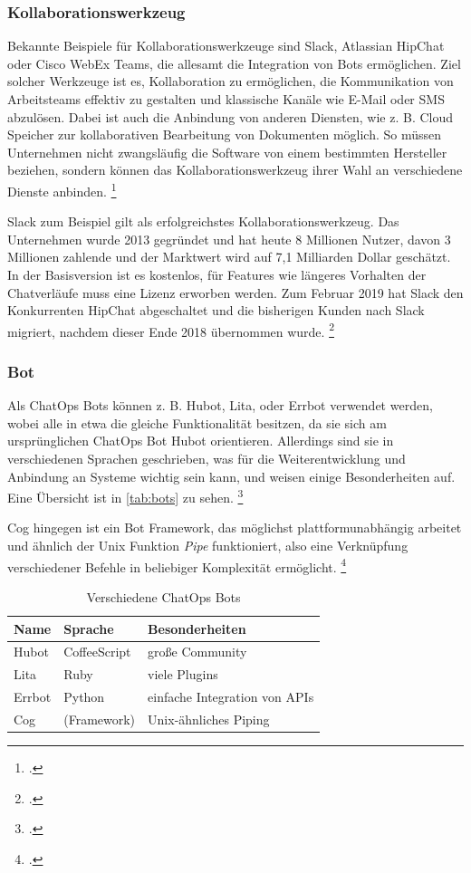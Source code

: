 \subsubsection{Kollaborationswerkzeug}
Bekannte Beispiele für Kollaborationswerkzeuge sind Slack, Atlassian HipChat oder Cisco WebEx Teams, die allesamt die Integration von Bots ermöglichen.
Ziel solcher Werkzeuge ist es, Kollaboration zu ermöglichen, die Kommunikation von Arbeitsteams effektiv zu gestalten und klassische Kanäle wie E-Mail oder SMS abzulösen. Dabei ist auch die Anbindung von anderen Diensten, wie z. B. Cloud Speicher zur kollaborativen Bearbeitung von Dokumenten möglich. So müssen Unternehmen nicht zwangsläufig die Software von einem bestimmten Hersteller beziehen, sondern können das Kollaborationswerkzeug ihrer Wahl an verschiedene Dienste anbinden.
\footcites[Vgl.][o. \pno]{Zyane_2017_ChatOps}[Vgl.][o. \pno]{Koeltzsch_2019_Slack}

Slack zum Beispiel gilt als erfolgreichstes Kollaborationswerkzeug. Das Unternehmen wurde 2013 gegründet und hat heute 8 Millionen Nutzer, davon 3 Millionen zahlende und der Marktwert wird auf 7,1 Milliarden Dollar geschätzt. In der Basisversion ist es kostenlos, für Features wie längeres Vorhalten der Chatverläufe muss eine Lizenz erworben werden.
Zum Februar 2019 hat Slack den Konkurrenten HipChat abgeschaltet und die bisherigen Kunden nach Slack migriert, nachdem dieser Ende 2018 übernommen wurde.
\footcites[Vgl.][o. \pno]{Koeltzsch_2019_Slack}[Vgl.][o. \pno]{Donath_2018_Hipchat_Uebernahme}

\subsubsection{Bot}
Als ChatOps Bots können z. B. Hubot, Lita, oder  Errbot verwendet werden, wobei alle in etwa die gleiche Funktionalität besitzen, da sie sich am ursprünglichen ChatOps Bot Hubot orientieren.
Allerdings sind sie in verschiedenen Sprachen geschrieben, was für die Weiterentwicklung und Anbindung an Systeme wichtig sein kann, und weisen einige Besonderheiten auf. Eine Übersicht ist in \autoref{tab:bots} zu sehen.
\footcite[Vgl.][o. \pno]{Zyane_2017_ChatOps}

Cog hingegen ist ein Bot Framework, das möglichst plattformunabhängig arbeitet und ähnlich der Unix Funktion \textit{Pipe} funktioniert, also eine Verknüpfung verschiedener Befehle in beliebiger Komplexität ermöglicht.
\footcite[Vgl.][o. \pno]{Zyane_2017_ChatOps}

\begin{table}[H]
\centering
\begin{tabularx}{.8\textwidth}{l|l|X}
  Name & Sprache & Besonderheiten\\\hline
  Hubot & CoffeeScript & große Community\\
  Lita & Ruby & viele Plugins\\
  Errbot & Python & einfache Integration von APIs\\
  Cog & (Framework) & Unix-ähnliches Piping\\
\end{tabularx}
\caption{Verschiedene ChatOps Bots}
\label{tab:bots}
\end{table}

